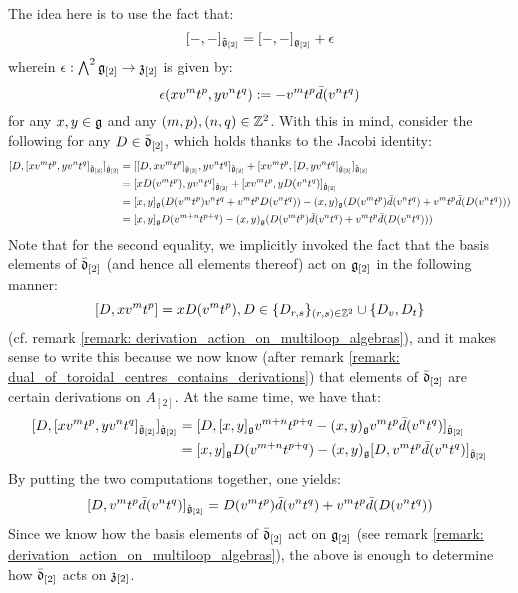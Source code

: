\begin{remark}
                The idea here is to use the fact that:
                    $$[-, -]_{\tilde{\mathfrak{g}}_{[2]}} = [-, -]_{\mathfrak{g}_{[2]}} + \epsilon$$
                wherein $\epsilon: \bigwedge^2 \mathfrak{g}_{[2]} \to \mathfrak{z}_{[2]}$ is given by:
                    $$\epsilon(x v^m t^p, y v^n t^q) := -v^m t^p \bar{d}(v^n t^q)$$
                for any $x, y \in \mathfrak{g}$ and any $(m, p), (n, q) \in \mathbb{Z}^2$. With this in mind, consider the following for any $D \in \bar{\mathfrak{d}}_{[2]}$, which holds thanks to the Jacobi identity:
                    $$
                        \begin{aligned}
                            [ D, [x v^m t^p, y v^n t^q]_{\tilde{\g}_{[2]}} ]_{\hat{\g}_{[2]}} & = [ [D, x v^m t^p]_{\hat{\g}_{[2]}}, y v^n t^q ]_{\tilde{\g}_{[2]}} + [ x v^m t^p, [D, y v^n t^q]_{\hat{\g}_{[2]}} ]_{\tilde{\g}_{[2]}}
                            \\
                            & = [x D(v^m t^p), y v^n t^q]_{\hat{\g}_{[2]}} + [x v^m t^p, y D(v^n t^q)]_{\hat{\g}_{[2]}}
                            \\
                            & = [x, y]_{\g} (D(v^m t^p) v^n t^q + v^m t^p D(v^n t^q)) - (x, y)_{\g} ( D(v^m t^p) \bar{d}(v^n t^q) + v^m t^p \bar{d}(D(v^n t^q)) )
                            \\
                            & = [x, y]_{\g} D(v^{m + n} t^{p + q}) - (x, y)_{\g} ( D(v^m t^p) \bar{d}(v^n t^q) + v^m t^p \bar{d}(D(v^n t^q)) )
                        \end{aligned}
                    $$
                Note that for the second equality, we implicitly invoked the fact that the basis elements of $\bar{\mathfrak{d}}_{[2]}$ (and hence all elements thereof) act on $\mathfrak{g}_{[2]}$ in the following manner:
                    $$[D, x v^m t^p] = x D(v^m t^p), D \in \{D_{r, s}\}_{(r, s) \in \mathbb{Z}^2} \cup \{D_v, D_t\}$$
                (cf. remark \ref{remark: derivation_action_on_multiloop_algebras}), and it makes sense to write this because we now know (after remark \ref{remark: dual_of_toroidal_centres_contains_derivations}) that elements of $\bar{\mathfrak{d}}_{[2]}$ are certain derivations on $A_{[2]}$. At the same time, we have that:
                    $$
                        \begin{aligned}
                            [ D, [x v^m t^p, y v^n t^q]_{\tilde{\g}_{[2]}} ]_{\hat{\g}_{[2]}} & = [ D, [x, y]_{\g} v^{m + n} t^{p + q} - (x, y)_{\g} v^m t^p \bar{d}(v^n t^q) ]_{\hat{\g}_{[2]}}
                            \\
                            & = [x, y]_{\g} D(v^{m + n} t^{p + q}) - (x, y)_{\g} [D, v^m t^p \bar{d}(v^n t^q)]_{\hat{\g}_{[2]}}
                        \end{aligned}
                    $$
                By putting the two computations together, one yields:
                    $$[D, v^m t^p \bar{d}(v^n t^q)]_{\hat{\mathfrak{g}}_{[2]}} = D(v^m t^p) \bar{d}(v^n t^q) + v^m t^p \bar{d}(D(v^n t^q))$$
                Since we know how the basis elements of $\bar{\mathfrak{d}}_{[2]}$ act on $\mathfrak{g}_{[2]}$ (see remark \ref{remark: derivation_action_on_multiloop_algebras}), the above is enough to determine how $\bar{\mathfrak{d}}_{[2]}$ acts on $\mathfrak{z}_{[2]}$. 


\end{remark}
